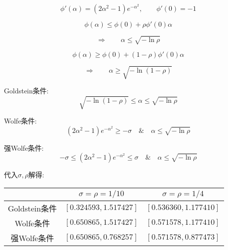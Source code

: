 \documentclass[UTF8]{ctexart}
\begin{document}
\begin{enumerate}
\begin{equation}
\phi'(\alpha)=(2\alpha^2-1)e^{-\alpha^2},\qquad \phi'(0)=-1
\end{equation}


\begin{equation}
\phi(\alpha)\leq \phi(0)+\rho \phi'(0) \alpha
\end{equation}


\begin{equation}
\Rightarrow \qquad \alpha \leq \sqrt{-\ln \rho}
\end{equation}

\begin{equation}
\phi(\alpha)\geq \phi(0)+(1-\rho) \phi'(0) \alpha
\end{equation}


\begin{equation}
\Rightarrow \qquad \alpha \geq \sqrt{-\ln (1-\rho)}
\end{equation}

Goldstein条件:
\begin{equation}
\sqrt{-\ln (1-\rho)} \leq \alpha \leq \sqrt{-\ln \rho}
\end{equation}

Wolfe条件:
\begin{equation}
(2\alpha^2-1)e^{-\alpha^2}\geq -\sigma \quad \& \quad \alpha \leq \sqrt{-\ln \rho}
\end{equation}

强Wolfe条件:
\begin{equation}
-\sigma \leq (2\alpha^2-1)e^{-\alpha^2}\leq \sigma \quad \& \quad \alpha \leq \sqrt{-\ln \rho}
\end{equation}

代入$\sigma,\rho$解得:

\begin{table}[H]
\centering
	\begin{tabular}{ccc}
	\toprule
	{}&$\sigma=\rho=1/10$&$\sigma=\rho=1/4$\\
	\midrule
    Goldstein条件   &  $[0.324593,1.517427]$&$[0.536360,1.177410]$\\
    Wolfe条件   &  $[0.650865,1.517427]$&$[0.571578,1.177410]$\\
    强Wolfe条件    &    $[0.650865,0.768257]$&$[0.571578,0.877473]$ \\
	\bottomrule
	\end{tabular}
\end{table}

\end{enumerate}
\end{document}
